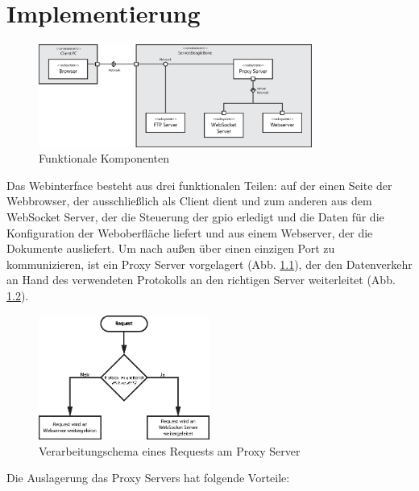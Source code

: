 \chapter{Implementierung}

\begin{figure}[ht]
\centering
\includegraphics[width = 0.8\textwidth]{documentation/images/components.eps}
\caption{Funktionale Komponenten}
\label{fig:functionalComponents}
\end{figure}

Das Webinterface besteht aus drei funktionalen Teilen: auf der einen Seite der Webbrowser, der ausschließlich als Client dient und zum anderen aus dem WebSocket Server, der die Steuerung der \gls{gpio} erledigt und die Daten für die Konfiguration der Weboberfläche liefert und aus einem Webserver, der die Dokumente ausliefert. Um nach außen über einen einzigen Port zu kommunizieren, ist ein Proxy Server vorgelagert (Abb. \ref{fig:functionalComponents}), der den Datenverkehr an Hand des verwendeten Protokolls an den richtigen Server weiterleitet (Abb. \ref{fig:requestForwarding}).

\begin{figure}[ht]
\centering
\includegraphics[width = 0.5\textwidth]{documentation/images/request.eps}
\caption{Verarbeitungschema eines Requests am Proxy Server}
\label{fig:requestForwarding}
\end{figure}

\noindent Die Auslagerung das Proxy Servers hat folgende Vorteile:

